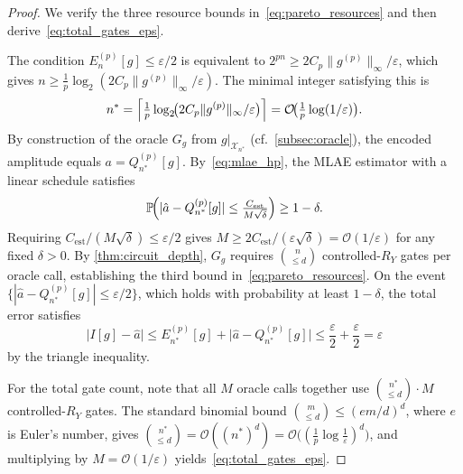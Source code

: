 \documentclass[12pt,a4paper]{article}
\theoremstyle{plain}
\theoremstyle{definition}
\theoremstyle{remark}
\newcommand{\Ry}{R_Y}
\begin{document}
\begin{proof}
We verify the three resource bounds in~\eqref{eq:pareto_resources} and
then derive~\eqref{eq:total_gates_eps}.

The condition $E_n^{(p)}[g]\leq\varepsilon/2$ is equivalent to
$2^{pn}\geq 2C_p\|g^{(p)}\|_\infty/\varepsilon$, which gives
$n\geq\frac{1}{p}\log_2(2C_p\|g^{(p)}\|_\infty/\varepsilon)$.
The minimal integer satisfying this is
\[
n^*=\Bigl\lceil\tfrac{1}{p}\log_2\!\bigl(2C_p\|g^{(p)}\|_\infty/\varepsilon\bigr)\Bigr\rceil
=\mathcal{O}\!\bigl(\tfrac{1}{p}\log(1/\varepsilon)\bigr).
\]
By construction of the oracle $G_g$ from $g|_{\mathcal{X}_{n^*}}$
(cf.\ \cref{subsec:oracle}),
the encoded amplitude equals $a = Q_{n^*}^{(p)}[g]$.
By~\eqref{eq:mlae_hp}, the MLAE estimator with a linear schedule
satisfies
\[
  \mathbb{P}\!\Bigl(|\hat{a} - Q_{n^*}^{(p)}[g]| \leq
  \tfrac{C_{\mathrm{est}}}{M\sqrt{\delta}}\Bigr) \geq 1-\delta.
\]
Requiring $C_{\mathrm{est}}/(M\sqrt{\delta})\leq\varepsilon/2$ gives
$M\geq 2C_{\mathrm{est}}/(\varepsilon\sqrt{\delta}) = \mathcal{O}(1/\varepsilon)$
for any fixed $\delta>0$.
By \cref{thm:circuit_depth}, $G_g$ requires $\binom{n}{\leq d}$
controlled-$\Ry$ gates per oracle call, establishing the third bound
in~\eqref{eq:pareto_resources}.
On the event $\{|\hat{a}-Q_{n^*}^{(p)}[g]|\leq\varepsilon/2\}$,
which holds with probability at least $1-\delta$, the total error
satisfies
\[
  \bigl|I[g]-\hat{a}\bigr|
  \leq E_{n^*}^{(p)}[g] + \bigl|\hat{a}-Q_{n^*}^{(p)}[g]\bigr|
  \leq \frac{\varepsilon}{2}+\frac{\varepsilon}{2} = \varepsilon
\]
by the triangle inequality.

For the total gate count, note that all $M$ oracle calls together use
$\binom{n^*}{\leq d}\cdot M$ controlled-$\Ry$ gates.
The standard binomial bound $\binom{m}{\leq d}\leq(em/d)^d$,
where $e$ is Euler's number, gives
$\binom{n^*}{\leq d}=\mathcal{O}((n^*)^d)
=\mathcal{O}\bigl((\tfrac{1}{p}\log\tfrac{1}{\varepsilon})^d\bigr)$,
and multiplying by $M=\mathcal{O}(1/\varepsilon)$ yields~\eqref{eq:total_gates_eps}.
\end{proof}
\end{document}
